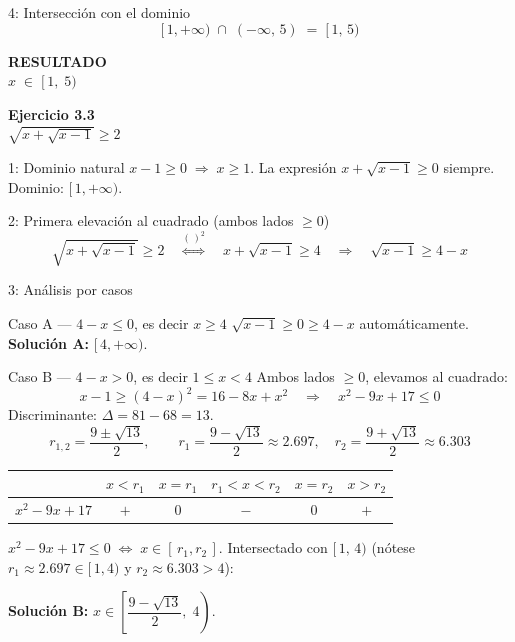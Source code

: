 \documentclass[letterpaper, 11pt]{article}
\newcommand{\exheader}[2]{%
    \begin{tcolorbox}[colback=azulFuerte!12, colframe=azulFuerte,
        arc=8pt, boxrule=1.5pt, enhanced]
        {\large\textbf{\color{azulFuerte}Ejercicio #1}} \\[0.4em]
        \centering\LARGE $\displaystyle #2$
    \end{tcolorbox}
    \smallskip}
\newcommand{\resultado}[1]{%
    \begin{tcolorbox}[colback=azulFuerte, colframe=azulFuerte, colupper=white,
        arc=8pt, boxrule=1.5pt, enhanced, drop shadow={black!12}]
        \centering\large\textbf{RESULTADO} \\[0.4em]
        \LARGE $\displaystyle #1$
    \end{tcolorbox}}
\begin{document}
\begin{paso}{4: Intersección con el dominio}
\[
    [\,1,+\infty) \;\cap\; (-\infty,\,5) \;=\; [\,1,\,5)
\]
\end{paso}

\resultado{x \;\in\; [\,1,\;5)}

\clearpage

\exheader{3.3}{\sqrt{x + \sqrt{x-1}} \geq 2}

\begin{paso}{1: Dominio natural}
$x - 1 \geq 0 \;\Rightarrow\; x \geq 1$. La expresión $x + \sqrt{x-1} \geq 0$ siempre.\\
Dominio: $[\,1,+\infty)$.
\end{paso}

\begin{paso}{2: Primera elevación al cuadrado (ambos lados $\geq 0$)}
\[
    \sqrt{x+\sqrt{x-1}} \geq 2
    \quad\stackrel{(\,)^2}{\Longleftrightarrow}\quad
    x + \sqrt{x-1} \geq 4
    \quad\Longrightarrow\quad
    \sqrt{x-1} \geq 4 - x
\]
\end{paso}

\begin{paso}{3: Análisis por casos}

\begin{caso}{Caso A --- $4 - x \leq 0$, es decir $x \geq 4$}
$\sqrt{x-1} \geq 0 \geq 4-x$ automáticamente.\\
\textbf{Solución A:} $[\,4,+\infty)$.
\end{caso}

\bigskip

\begin{caso}{Caso B --- $4 - x > 0$, es decir $1 \leq x < 4$}
Ambos lados $\geq 0$, elevamos al cuadrado:
\[
    x - 1 \geq (4-x)^2 = 16 - 8x + x^2
    \quad\Longrightarrow\quad
    x^2 - 9x + 17 \leq 0
\]
Discriminante: $\Delta = 81 - 68 = 13$.
\[
    r_{1,2} = \frac{9 \pm \sqrt{13}}{2}, \qquad
    r_1 = \frac{9-\sqrt{13}}{2} \approx 2.697, \quad
    r_2 = \frac{9+\sqrt{13}}{2} \approx 6.303
\]

\begin{center}
\renewcommand{\arraystretch}{1.5}
\begin{tabular}{c|ccccc}
    & $x{<}r_1$ & $x{=}r_1$ & $r_1{<}x{<}r_2$ & $x{=}r_2$ & $x{>}r_2$ \\
\hline
\rowcolor{celesteSuave}
$x^2-9x+17$ & $+$ & $0$ & $\mathbf{-}$ & $0$ & $+$ \\
\end{tabular}
\end{center}

$x^2-9x+17 \leq 0 \;\Leftrightarrow\; x \in [\,r_1, r_2\,]$.
Intersectado con $[\,1,\,4)$ (nótese $r_1 \approx 2.697 \in [\,1,4)$ y $r_2 \approx 6.303 > 4$):

\textbf{Solución B:} $x \in \left[\dfrac{9-\sqrt{13}}{2},\;4\right)$.
\end{caso}

\end{paso}
\end{document}
